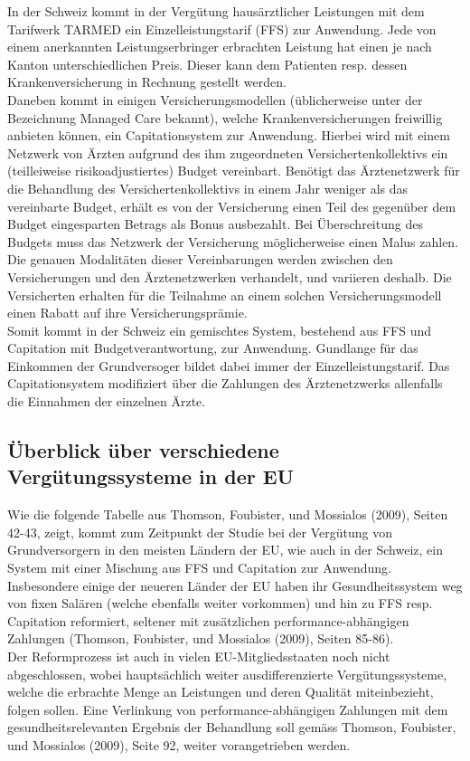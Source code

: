 \documentclass[ngerman,a4paper]{article}
\begin{document}
In der Schweiz kommt in der Vergütung hausärztlicher Leistungen mit dem
Tarifwerk TARMED ein Einzelleistungstarif (FFS) zur Anwendung. Jede von
einem anerkannten Leistungserbringer erbrachten Leistung hat einen je
nach Kanton unterschiedlichen Preis. Dieser kann dem Patienten resp.
dessen Krankenversicherung in Rechnung gestellt werden.\\
Daneben kommt in einigen Versicherungsmodellen (üblicherweise unter der
Bezeichnung Managed Care bekannt), welche Krankenversicherungen
freiwillig anbieten können, ein Capitationsystem zur Anwendung. Hierbei
wird mit einem Netzwerk von Ärzten aufgrund des ihm zugeordneten
Versichertenkollektivs ein (teilleiweise risikoadjustiertes) Budget
vereinbart. Benötigt das Ärztenetzwerk für die Behandlung des
Versichertenkollektivs in einem Jahr weniger als das vereinbarte Budget,
erhält es von der Versicherung einen Teil des gegenüber dem Budget
eingesparten Betrags als Bonus ausbezahlt. Bei Überschreitung des
Budgets muss das Netzwerk der Versicherung möglicherweise einen Malus
zahlen. Die genauen Modalitäten dieser Vereinbarungen werden zwischen
den Versicherungen und den Ärztenetzwerken verhandelt, und variieren
deshalb. Die Versicherten erhalten für die Teilnahme an einem solchen
Versicherungsmodell einen Rabatt auf ihre Versicherungsprämie.\\
Somit kommt in der Schweiz ein gemischtes System, bestehend aus FFS und
Capitation mit Budgetverantwortung, zur Anwendung. Gundlange für das
Einkommen der Grundversoger bildet dabei immer der Einzelleistungstarif.
Das Capitationsystem modifiziert über die Zahlungen des Ärztenetzwerks
allenfalls die Einnahmen der einzelnen Ärzte.

\subsection{Überblick über verschiedene Vergütungssysteme in der
EU}\label{uberblick-uber-verschiedene-vergutungssysteme-in-der-eu}

Wie die folgende Tabelle aus Thomson, Foubister, und Mossialos (2009),
Seiten 42-43, zeigt, kommt zum Zeitpunkt der Studie bei der Vergütung
von Grundversorgern in den meisten Ländern der EU, wie auch in der
Schweiz, ein System mit einer Mischung aus FFS und Capitation zur
Anwendung. Insbesondere einige der neueren Länder der EU haben ihr
Gesundheitssystem weg von fixen Salären (welche ebenfalls weiter
vorkommen) und hin zu FFS resp. Capitation reformiert, seltener mit
zusätzlichen performance-abhängigen Zahlungen (Thomson, Foubister, und
Mossialos (2009), Seiten 85-86).\\
Der Reformprozess ist auch in vielen EU-Mitgliedsstaaten noch nicht
abgeschlossen, wobei hauptsächlich weiter ausdifferenzierte
Vergütungssysteme, welche die erbrachte Menge an Leistungen und deren
Qualität miteinbezieht, folgen sollen. Eine Verlinkung von
performance-abhängigen Zahlungen mit dem gesundheitsrelevanten Ergebnis
der Behandlung soll gemäss Thomson, Foubister, und Mossialos (2009),
Seite 92, weiter vorangetrieben werden.
\end{document}
